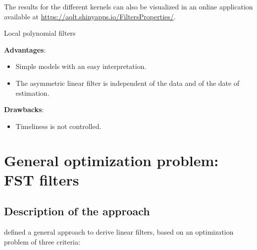 \documentclass[
  12pt,
  ,
  a4paper]{article}
\providecommand{\tightlist}{%
  \setlength{\itemsep}{0pt}\setlength{\parskip}{0pt}}
\newcommand\1{\mathds{1}}
\begin{document}
The results for the different kernels can also be visualized in an online application available at \url{https://aqlt.shinyapps.io/FiltersProperties/}.

\begin{summary}{Local polynomial filters}

\textbf{Advantages}:

\begin{itemize}
\item
  Simple models with an easy interpretation.
\item
  The asymmetric linear filter is independent of the data and of the date of estimation.
\end{itemize}

\textbf{Drawbacks}:

\begin{itemize}
\tightlist
\item
  Timeliness is not controlled.
\end{itemize}

\end{summary}

\hypertarget{sec:GuggemosEtAl}{%
\section{General optimization problem: FST filters}\label{sec:GuggemosEtAl}}

\hypertarget{description-of-the-approach}{%
\subsection{Description of the approach}\label{description-of-the-approach}}

\textcite{ch15HBSA} defined a general approach to derive linear filters, based on an optimization problem of three criteria:
\end{document}
